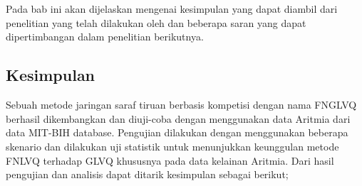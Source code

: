 \chapter{\kesimpulan}
Pada bab ini akan dijelaskan mengenai kesimpulan yang dapat diambil dari
penelitian yang telah dilakukan oleh \saya dan beberapa saran yang dapat
dipertimbangan dalam penelitian berikutnya.

\section{Kesimpulan}
Sebuah metode jaringan saraf tiruan berbasis kompetisi dengan nama
FNGLVQ berhasil dikembangkan dan diuji-coba dengan menggunakan data Aritmia
dari data MIT-BIH database. Pengujian dilakukan dengan menggunakan beberapa
skenario dan dilakukan uji statistik untuk menunjukkan keunggulan metode FNLVQ
terhadap GLVQ khususnya pada data kelainan Aritmia. Dari hasil pengujian dan
analisis dapat ditarik kesimpulan sebagai berikut;
